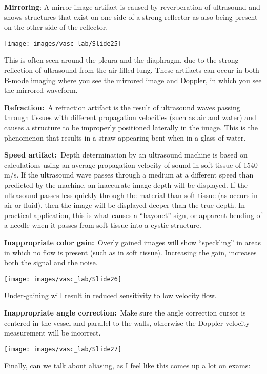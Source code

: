 \documentclass[
]{book}
\begin{document}
\textbf{Mirroring}: A mirror-image artifact is caused by reverberation of
ultrasound and shows structures that exist on one side of a strong
reflector as also being present on the other side of the reflector.

\texttt{[image: images/vasc\_lab/Slide25]}

This is often seen around the pleura and the diaphragm, due to the
strong reflection of ultrasound from the air-filled lung. These
artifacts can occur in both B-mode imaging where you see the mirrored
image and Doppler, in which you see the mirrored waveform.

\textbf{Refraction:}~A refraction artifact is the result of ultrasound waves
passing through tissues with different propagation velocities (such as
air and water) and causes a structure to be improperly positioned
laterally in the image. This is the phenomenon that results in a straw
appearing bent when in a glass of water.

\textbf{Speed artifact:}~Depth determination by an ultrasound machine is
based on calculations using an average propagation velocity of sound in
soft tissue of 1540 m/s. If the ultrasound wave passes through a medium
at a different speed than predicted by the machine, an inaccurate image
depth will be displayed. If the ultrasound passes less quickly through
the material than soft tissue (as occurs in air or fluid), then the
image will be displayed deeper than the true depth. In practical
application, this is what causes a ``bayonet'' sign, or apparent bending
of a needle when it passes from soft tissue into a cystic structure.

\textbf{Inappropriate color gain:}~Overly gained images will show ``speckling''
in areas in which no flow is present (such as in soft tissue).
Increasing the gain, increases both the signal and the
noise.\citep{kremkau2021}

\texttt{[image: images/vasc\_lab/Slide26]}

Under-gaining will result in reduced sensitivity to low velocity flow.

\textbf{Inappropriate angle correction:}~Make sure the angle correction
cursor is centered in the vessel and parallel to the walls, otherwise
the Doppler velocity measurement will be incorrect.

\texttt{[image: images/vasc\_lab/Slide27]}

Finally, can we talk about aliasing, as I feel like this comes up a lot
on exams:
\end{document}
